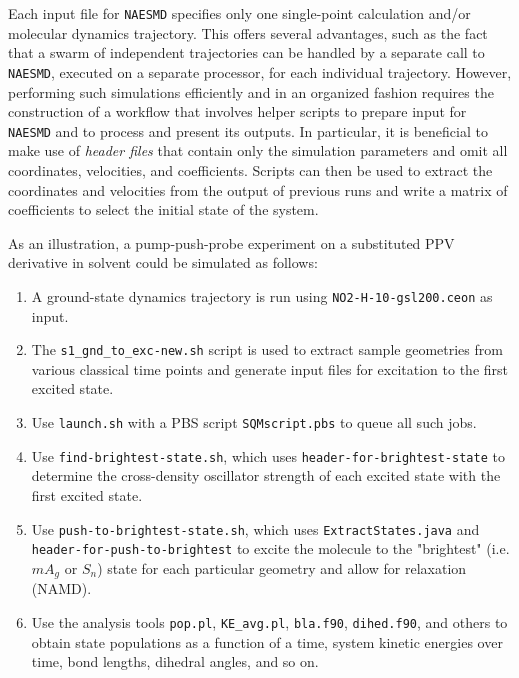 \documentclass[12pt,letter,footinclude=true,headinclude=true,hyphens]{book} %
\begin{document}
    Each input file for \texttt{NAESMD} specifies only one single-point calculation and/or molecular dynamics trajectory. This offers several advantages, such as the fact that a swarm of independent trajectories can be handled by a separate call to \texttt{NAESMD}, executed on a separate processor, for each individual trajectory. However, performing such simulations efficiently and in an organized fashion requires the construction of a workflow that involves helper scripts to prepare input for \texttt{NAESMD} and to process and present its outputs. In particular, it is beneficial to make use of \emph{header files} that contain only the simulation parameters and omit all coordinates, velocities, and coefficients. Scripts can then be used to extract the coordinates and velocities from the output of previous runs and write a matrix of coefficients to select the initial state of the system.
    
    As an illustration, a pump-push-probe experiment on a substituted PPV derivative in solvent could be simulated as follows:
    
    \begin{enumerate}
    \item A ground-state dynamics trajectory is run using \texttt{NO2-H-10-gsl200.ceon} as input.
    \item The \texttt{s1\_gnd\_to\_exc-new.sh} script is used to extract sample geometries from various classical time points and generate input files for excitation to the first excited state.
    \item Use \texttt{launch.sh} with a PBS script \texttt{SQMscript.pbs} to queue all such jobs.
    \item Use \texttt{find-brightest-state.sh}, which uses \texttt{header-for-brightest-state} to determine the cross-density oscillator strength of each excited state with the first excited state.
    \item Use \texttt{push-to-brightest-state.sh}, which uses \texttt{ExtractStates.java} and \texttt{header-for-push-to-brightest} to excite the molecule to the "brightest" (i.e. $mA_g$ or $S_n$) state for each particular geometry and allow for relaxation (NAMD).
    \item Use the analysis tools \texttt{pop.pl}, \texttt{KE\_avg.pl}, \texttt{bla.f90}, \texttt{dihed.f90}, and others to obtain state populations as a function of a time, system kinetic energies over time, bond lengths, dihedral angles, and so on. 
    \end{enumerate}
    
\end{document}
